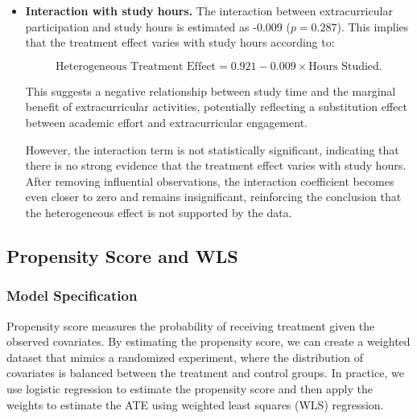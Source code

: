 \documentclass[10pt,letterpaper]{article}
\begin{document}
\begin{itemize}
\item \textbf{Interaction with study hours.} 
The interaction between extracurricular participation and study hours is estimated as -0.009 ($p = 0.287$). This implies that the treatment effect varies with study hours according to:

\[
\text{Heterogeneous Treatment Effect} = 0.921 - 0.009 \times \text{Hours Studied}.
\]

This suggests a negative relationship between study time and the marginal benefit of extracurricular activities, potentially reflecting a substitution effect between academic effort and extracurricular engagement.

However, the interaction term is not statistically significant, indicating that there is no strong evidence that the treatment effect varies with study hours. After removing influential observations, the interaction coefficient becomes even closer to zero and remains insignificant, reinforcing the conclusion that the heterogeneous effect is not supported by the data.
\end{itemize}







\subsection{Propensity Score and WLS}

\subsubsection{Model Specification}

Propensity score measures the probability of receiving treatment given the observed covariates. By estimating the propensity score, we can create a weighted dataset that mimics a randomized experiment, where the distribution of covariates is balanced between the treatment and control groups. In practice, we use logistic regression to estimate the propensity score and then apply the weights to estimate the ATE using weighted least squares (WLS) regression.
\end{document}
